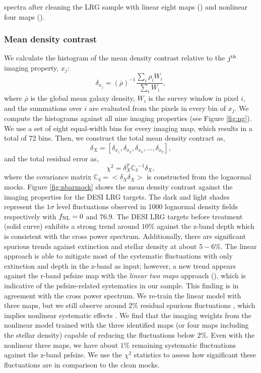 spectra after cleaning the LRG sample with linear eight maps () and nonlinear four maps (). 

\subsubsection{Mean density contrast}
We calculate the histogram of the mean density contrast relative to the $j^{\rm th}$ imaging property, $x_{j}$:
\begin{equation}
\delta_{x_{j}} = ({\overline{\rho}})^{-1} \frac{\sum_{i} \rho_{i} W_{i}}{\sum_{i} W_{i}},
\end{equation}
where $\overline{\rho}$ is the global mean galaxy density, $W_{i}$ is the survey window in pixel $i$, and the summations over $i$ are evaluated from the pixels in every bin of $x_{j}$. We compute the histograms against all nine imaging properties (see Figure \ref{fig:ng}). We use a set of eight equal-width bins for every imaging map, which results in a total of 72 bins. Then, we construct the total mean density contract as,
\begin{equation}
\delta_{X} = [\delta_{x_{1}}, \delta_{x_{2}}, \delta_{x_{3}}, ..., \delta_{x_{9}}],
\end{equation}
and the total residual error as,
\begin{equation}
\chi^{2} = \delta_{X}^{T} \mathbb{C_{\delta}}^{-1} \delta_{X},
\end{equation}
where the covariance matrix $\mathbb{C}_{\delta} = < \delta_{X} \delta_{X}>$ is constructed from the lognormal mocks. Figure \ref{fig:nbarmock} shows the mean density contrast against the imaging properties for the DESI LRG targets. The dark and light shades represent the $1\sigma$ level fluctuations observed in 1000 lognormal density fields respectively with $f_{\rm NL}=0$ and $76.9$. The DESI LRG targets before treatment (solid curve) exhibits a strong trend around $10\%$ against the z-band depth which is consistent with the cross power spectrum. Additionally, there are significant spurious trends against extinction and stellar density at about $5-6\%$. The linear approach is able to mitigate most of the systematic fluctuations with only extinction and depth in the z-band as input; however, a new trend appears against the r-band psfsize map with the \textit{linear two maps} approach (), which is indicative of the psfsize-related systematics in our sample. This finding is in agreement with the cross power spectrum. We re-train the linear model with three maps, but we still observe around $2\%$ residual spurious fluctuations , which implies  nonlinear systematic effects . We find that the imaging weights from the nonlinear model trained with the three identified maps (or four maps including the stellar density)  capable of reducing the fluctuations below $2\%$. Even with the nonlinear three maps, we have about $1\%$ remaining systematic fluctuations against the z-band psfsize. We use the $\chi^{2}$ statistics to assess how significant these fluctuations are in comparison to the clean mocks. 

